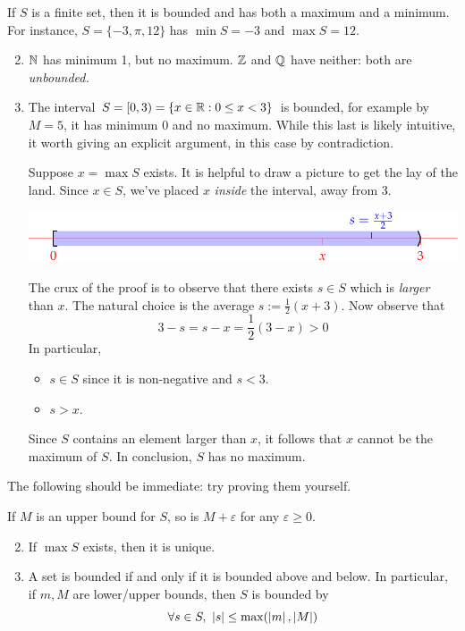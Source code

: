 \begin{examples}{}{}
	\exstart If $S$ is a finite set, then it is bounded and has both a maximum and a minimum. For instance, $S=\{-3,\pi,12\}$ has $\min S=-3$ and $\max S=12$.
	\begin{enumerate}\setcounter{enumi}{1}
		\item $\mathbb{N}$ has minimum 1, but no maximum. $\mathbb{Z}$ and $\mathbb{Q}$ have neither: both are \emph{unbounded.}
		\item The interval $S=[0,3)=\{x\in\mathbb{R}:0\le x<3\}$ is bounded, for example by $M=5$, it has minimum 0 and no maximum. While this last is likely intuitive, it worth giving an explicit argument, in this case by contradiction.\par
		Suppose $x=\max S$ exists. It is helpful to draw a picture to get the lay of the land. Since $x\in S$, we've placed $x$ \emph{inside} the interval, away from 3.
		\begin{center}
	  	\includegraphics{nomax1}
	  \end{center}
	  The crux of the proof is to observe that there exists $s\in S$ which is \emph{larger} than $x$. The natural choice is the average $s:=\frac 12(x+3)$. Now observe that
	  \[3-s=s-x=\frac 12(3-x)>0\]
	  In particular,
		\begin{itemize}
		  \item $s\in S$ since it is non-negative and $s<3$.
		  \item $s>x$.
		\end{itemize}
		Since $S$ contains an element larger than $x$, it follows that $x$ cannot be the maximum of $S$. In conclusion, $S$ has no maximum.
	\end{enumerate}
\end{examples}

\goodbreak

The following should be immediate: try proving them yourself.

\begin{lemm}{}{}
	\exstart If $M$ is an upper bound for $S$, so is $M+\varepsilon$ for any $\varepsilon\ge 0$.
	\begin{enumerate}\setcounter{enumi}{1}
	  \item If $\max S$ exists, then it is unique.
	  \item A set is bounded if and only if it is bounded above and below. In particular, if $m,M$ are lower/upper bounds, then $S$ is bounded by 
	  \[\forall s\in S,\ \left| s\right|\le\max(\left| m\right|,\left| M\right|)\]
	\end{enumerate}
\end{lemm}


